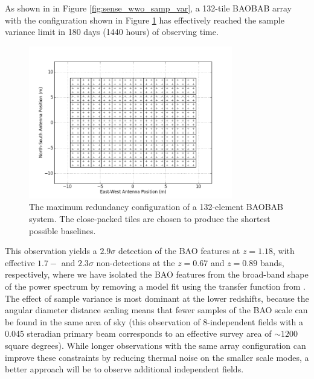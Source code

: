\documentclass[10pt,iop]{emulateapj}
\begin{document}
As shown in in Figure \ref{fig:sense_wwo_samp_var}, a 132-tile BAOBAB array with the configuration
shown in Figure \ref{fig:antpos128} has effectively reached
the sample variance limit in 180 days (1440 hours) of observing time.  
\begin{figure}\centering
\includegraphics[width=3.5in]{antpos128-2.png}
\caption{The maximum redundancy configuration of a 132-element BAOBAB system.  The close-packed
tiles are chosen to produce the shortest possible baselines.
} \label{fig:antpos128}
\end{figure}
This observation yields a $2.9\sigma$ detection of the BAO features at $z = 1.18$, 
with effective $1.7-$ and $2.3\sigma$ non-detections at the $z = 0.67$ and $z = 0.89$ bands,
respectively, where we have isolated the BAO features from the broad-band shape of the
power spectrum by removing a model fit using the transfer function from
\citet{eisenstein_and_hu_1998}.
The effect of sample variance is most dominant at the lower redshifts, 
because the angular diameter distance scaling means that fewer samples of the BAO scale can be
found in the same area of sky (this observation of 8-independent fields with a
0.045 steradian primary beam corresponds to an effective survey area of $\sim 1200$ square degrees).
While longer observations with the same array configuration can improve these constraints
by reducing thermal noise on the smaller scale modes, a
better approach will be to observe additional independent fields.
\end{document}
